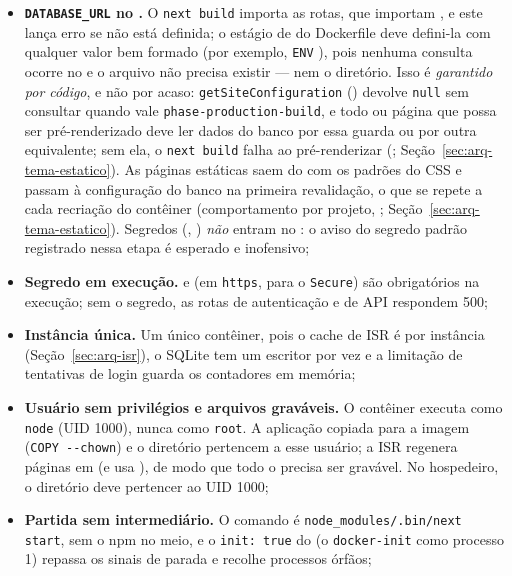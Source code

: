 \begin{itemize}
  \item \textbf{\texttt{DATABASE\_URL} no .} O \texttt{next build} importa as rotas, que importam , e este lança erro se  não está definida; o estágio de  do Dockerfile deve defini-la com qualquer valor bem formado (por exemplo, \texttt{ENV} ), pois nenhuma consulta ocorre no  e o arquivo não precisa existir --- nem o diretório. Isso é \emph{garantido por código}, e não por acaso: \texttt{getSiteConfiguration} () devolve \texttt{null} sem consultar quando  vale \texttt{phase-production-build}, e todo  ou página que possa ser pré-renderizado deve ler dados do banco por essa guarda ou por outra equivalente; sem ela, o \texttt{next build} falha ao pré-renderizar  (; Seção~\ref{sec:arq-tema-estatico}). As páginas estáticas saem do  com os padrões do CSS e passam à configuração do banco na primeira revalidação, o que se repete a cada recriação do contêiner (comportamento por projeto, ; Seção~\ref{sec:arq-tema-estatico}). Segredos (, ) \emph{não} entram no : o aviso do segredo padrão registrado nessa etapa é esperado e inofensivo;
  \item \textbf{Segredo em execução.}  e  (em \texttt{https}, para o  \texttt{Secure}) são obrigatórios na execução; sem o segredo, as rotas de autenticação e de API respondem 500;
  \item \textbf{Instância única.} Um único contêiner, pois o cache de ISR é por instância (Seção~\ref{sec:arq-isr}), o SQLite tem um escritor por vez e a limitação de tentativas de login guarda os contadores em memória;
  \item \textbf{Usuário sem privilégios e arquivos graváveis.} O contêiner executa como \texttt{node} (UID 1000), nunca como \texttt{root}. A aplicação copiada para a imagem (\texttt{COPY -{}-chown}) e o diretório  pertencem a esse usuário; a ISR regenera páginas em  (e usa ), de modo que todo o  precisa ser gravável. No hospedeiro, o diretório  deve pertencer ao UID 1000;
  \item \textbf{Partida sem intermediário.} O comando é \texttt{node\_modules/.bin/next start}, sem o npm no meio, e o \texttt{init: true} do  (o \texttt{docker-init} como processo 1) repassa os sinais de parada e recolhe processos órfãos;

\end{itemize}
